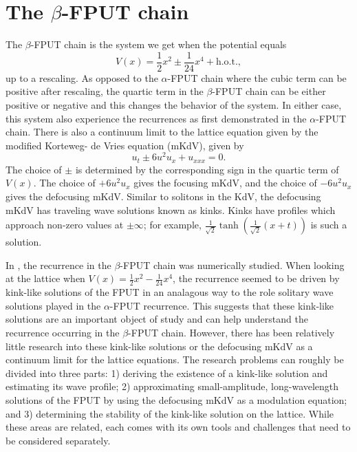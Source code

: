 \section{The \(\beta\)-FPUT chain}

The \(\beta\)-FPUT chain is the system we get when the potential equals
\begin{equation}
	V(x) = \frac 12 x^2 \pm \frac 1 {24}x^4 + \text{h.o.t.},
\end{equation}
up to a rescaling. As opposed to the \(\alpha\)-FPUT chain where the cubic term can be positive after rescaling, the quartic term in the \(\beta\)-FPUT chain can be either positive or negative and this changes the behavior of the system. In either case, this system also experience the recurrences as first demonstrated in the \(\alpha\)-FPUT chain. There is also a continuum limit to the lattice equation given by the modified Korteweg- de Vries equation (mKdV), given by 
\begin{equation}
	u_t \pm 6 u^2 u_x + u_{xxx} = 0.
\end{equation}
The choice of \(\pm\) is determined by the corresponding sign in the quartic term of \(V(x)\). The choice of \(+6u^2u_x\) gives the focusing mKdV, and the choice of \(-6u^2u_x\) gives the defocusing mKdV. Similar to solitons in the KdV, the defocusing mKdV has traveling wave solutions known as kinks. Kinks have profiles which approach non-zero values at \(\pm \infty\); for example, \(\frac 1 {\sqrt 2} \tanh(\frac 1 {\sqrt 2} (x+t))\) is such a solution.

In \cite{pace2019beta}, the recurrence in the \(\beta\)-FPUT chain was numerically studied. When looking at the lattice when \(V(x) = \frac  12 x^2 - \frac 1 {24}x^4\), the recurrence seemed to be driven by kink-like solutions of the FPUT in an analagous way to the role solitary wave solutions played in the \(\alpha\)-FPUT recurrence. This suggests that these kink-like solutions are an important object of study and can help understand the recurrence occurring in the \(\beta\)-FPUT chain. However, there has been relatively little research into these kink-like solutions or the defocusing mKdV as a continuum limit for the lattice equations. The research problems can roughly be divided into three parts: 1) deriving the existence of a kink-like solution and estimating its wave profile; 2) approximating small-amplitude, long-wavelength solutions of the FPUT by using the defocusing mKdV as a modulation equation; and 3) determining the stability of the kink-like solution on the lattice. While these areas are related, each comes with its own tools and challenges that need to be considered separately. 


